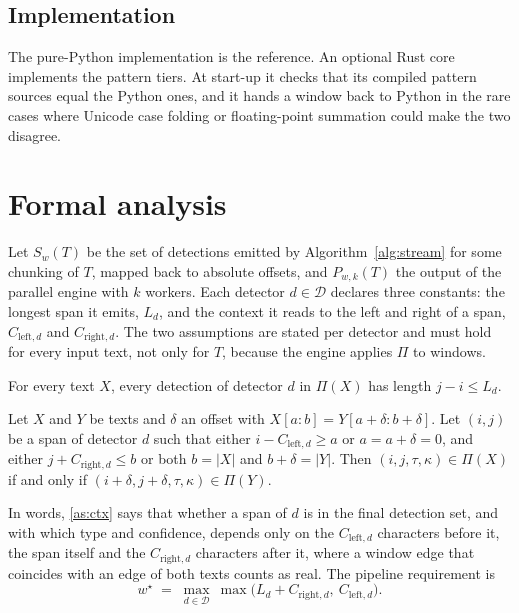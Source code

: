 \documentclass[pdflatex,sn-mathphys-num]{sn-jnl}
\theoremstyle{\ssThmStyle}
\theoremstyle{\ssDefStyle}
\begin{document}
\subsection{Implementation}
The pure-Python implementation is the reference. An optional Rust core implements the pattern tiers. At start-up it checks that its compiled pattern sources equal the Python ones, and it hands a window back to Python in the rare cases where Unicode case folding or floating-point summation could make the two disagree.

\section{Formal analysis}\label{sec:formal}

Let $S_w(T)$ be the set of detections emitted by Algorithm~\ref{alg:stream} for some chunking of $T$, mapped back to absolute offsets, and $P_{w,k}(T)$ the output of the parallel engine with $k$ workers. Each detector $d \in \mathcal{D}$ declares three constants: the longest span it emits, $L_d$, and the context it reads to the left and right of a span, $C_{\mathrm{left},d}$ and $C_{\mathrm{right},d}$. The two assumptions are stated per detector and must hold for every input text, not only for $T$, because the engine applies $\Pi$ to windows.

\begin{assumption}\label{as:span}
For every text $X$, every detection of detector $d$ in $\Pi(X)$ has length $j - i \le L_d$.
\end{assumption}

\begin{assumption}\label{as:ctx}
Let $X$ and $Y$ be texts and $\delta$ an offset with $X[a{:}b] = Y[a{+}\delta : b{+}\delta]$. Let $(i, j)$ be a span of detector $d$ such that either $i - C_{\mathrm{left},d} \ge a$ or $a = a + \delta = 0$, and either $j + C_{\mathrm{right},d} \le b$ or both $b = |X|$ and $b + \delta = |Y|$. Then $(i, j, \tau, \kappa) \in \Pi(X)$ if and only if $(i + \delta, j + \delta, \tau, \kappa) \in \Pi(Y)$.
\end{assumption}

In words, \ref{as:ctx} says that whether a span of $d$ is in the final detection set, and with which type and confidence, depends only on the $C_{\mathrm{left},d}$ characters before it, the span itself and the $C_{\mathrm{right},d}$ characters after it, where a window edge that coincides with an edge of both texts counts as real. The pipeline requirement is
\begin{equation}\label{eq:wstar}
w^{\star} \;=\; \max_{d \in \mathcal{D}}\ \max\bigl(L_d + C_{\mathrm{right},d},\ C_{\mathrm{left},d}\bigr).
\end{equation}
\end{document}
